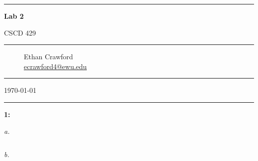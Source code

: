 \documentclass[]{article}
\begin{document}
\begin{titlepage}
    \centering

    \vspace*{1cm}

    \rule{.7\textwidth}{1pt}

    \vspace{.7\baselineskip}
    {\huge \textbf{Lab 2}}

    \vspace*{.5cm}
    {\Large CSCD 429}
    
    \rule{.7\textwidth}{1pt}

    \vspace{1cm}

    \large

    \begin{figure}[!ht]
        \large
        \centering
        Ethan Crawford \\
        {\normalsize \url{ecrawford4@ewu.edu}}
    \end{figure}


    \vspace{3cm}


    \vfill

    \rule{.7\textwidth}{1pt}

    \vspace*{.25cm}

    \Large \today

    \rule{.7\textwidth}{1pt}

\end{titlepage}

\noindent\textbf{1:}

\vspace{5mm}\textit{a.}

\begin{lstlisting}
\end{lstlisting}

\vspace{5mm}\textit{b.}
\end{document}
